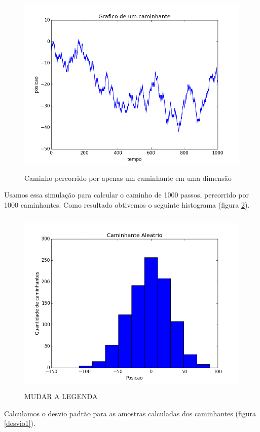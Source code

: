 \documentclass[12pt,a4paper]{article}
\begin{document}
\begin{figure}[H]
\centering
\includegraphics[width=12cm,height=9cm]{imgs/1d/um_caminhante.png}
\caption{Caminho percorrido por apenas um caminhante em uma dimensão}
\label{um_caminhante1}
\end{figure}


Usamos essa simulação para calcular o caminho de 1000 passos, percorrido por 1000 caminhantes. Como resultado obtivemos o seguinte histograma (figura \ref{histograma1}).

\begin{figure}[H]
\centering
\includegraphics[width=12cm,height=9cm]{imgs/1d/histograma.png}
\caption{MUDAR A LEGENDA}
\label{histograma1}
\end{figure}

Calculamos o desvio padrão para as amostras calculadas dos caminhantes (figura \ref{desvio1}).
\end{document}
